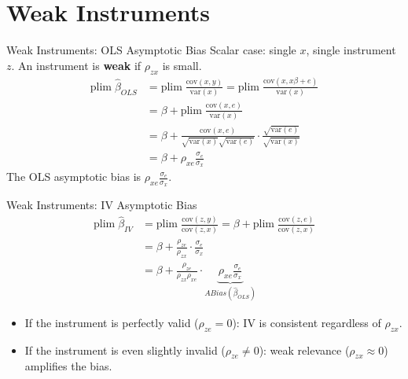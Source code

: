 \documentclass[aspectratio=169, handout]{beamer}
\numberwithin{equation}{section}
\begin{document}
\section{Weak Instruments}

\begin{frame}{Weak Instruments: OLS Asymptotic Bias}
Scalar case: single $x$, single instrument $z$.  An instrument is \textbf{weak} if $\rho_{zx}$ is small.
\begin{align*}
\text{plim}\;\hat{\beta}_{OLS}&=\text{plim}\;\frac{\text{cov}(x,y)}{\text{var}(x)}=\text{plim}\;\frac{\text{cov}(x,x\beta+e)}{\text{var}(x)}\\
&=\beta+\text{plim}\;\frac{\text{cov}(x,e)}{\text{var}(x)}\\
&=\beta+\frac{\text{cov}(x,e)}{\sqrt{\text{var}(x)}\sqrt{\text{var}(e)}}\cdot\frac{\sqrt{\text{var}(e)}}{\sqrt{\text{var}(x)}}\\
&=\beta+\rho_{xe}\frac{\sigma_e}{\sigma_x}
\end{align*}
The OLS asymptotic bias is $\rho_{xe}\frac{\sigma_e}{\sigma_x}$.
\end{frame}


\begin{frame}{Weak Instruments: IV Asymptotic Bias}
\begin{align*}
\text{plim}\;\hat{\beta}_{IV}&=\text{plim}\;\frac{\text{cov}(z,y)}{\text{cov}(z,x)}=\beta+\text{plim}\;\frac{\text{cov}(z,e)}{\text{cov}(z,x)}\\[4pt]
&=\beta+\frac{\rho_{ze}}{\rho_{zx}}\cdot\frac{\sigma_e}{\sigma_x}\\[4pt]
&=\beta+\frac{\rho_{ze}}{\rho_{zx}\rho_{xe}}\cdot\underbrace{\rho_{xe}\frac{\sigma_e}{\sigma_x}}_{ABias(\hat{\beta}_{OLS})}
\end{align*}
\begin{itemize}
\item If the instrument is perfectly valid ($\rho_{ze}=0$): IV is consistent regardless of $\rho_{zx}$.
\item If the instrument is even slightly invalid ($\rho_{ze}\neq 0$): weak relevance ($\rho_{zx}\approx 0$) \alert{amplifies} the bias.
\end{itemize}
\end{frame}
\end{document}
